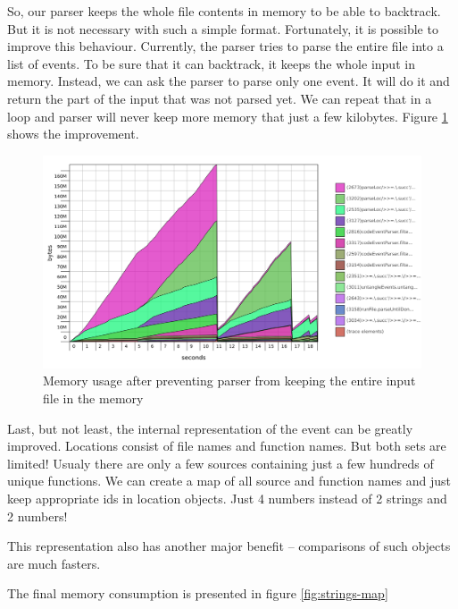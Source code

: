 So, our parser keeps the whole file contents in memory to be able to backtrack. But it is not necessary with
such a simple format. Fortunately, it is possible to improve this behaviour.
Currently, the parser tries to parse the entire file into a list of events. To be sure that it can backtrack,
it keeps the whole input in memory. Instead, we can ask the parser to parse only one event. 
It will do it and return the part of the input that was not parsed yet. We can repeat that in a loop
and parser will never keep more memory that just a few kilobytes. 
Figure \ref{fig:single-event} shows the improvement.

\begin{figure}[hbt!]
 \centering
 \includegraphics[width=\textwidth]{png/single-event}
 \caption{Memory usage after preventing parser from keeping the entire input file in the memory}
 \label{fig:single-event}
\end{figure}

Last, but not least, the internal representation of the event can be greatly improved.
Locations consist of file names and function names. But both sets are limited!
Usualy there are only a few sources containing just a few hundreds of unique functions. 
We can create a map of all source and function names and just keep appropriate ids in location objects.
Just 4 numbers instead of 2 strings and 2 numbers!

This representation also has another major benefit -- comparisons of such objects are much fasters.

The final memory consumption is presented in figure \ref{fig:strings-map}

